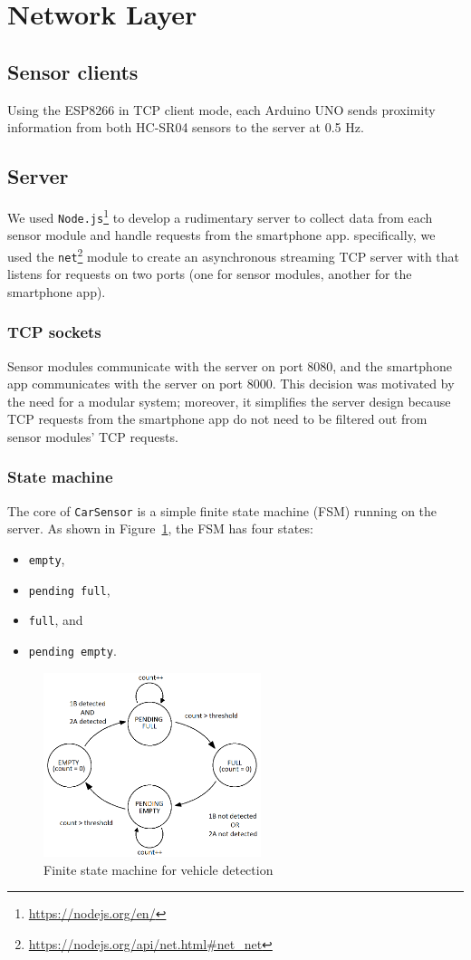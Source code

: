 \documentclass[conference]{IEEEtran}
\begin{document}
\section{Network Layer}
\subsection{Sensor clients}
Using the ESP8266 in TCP client mode, each Arduino UNO sends proximity information from both HC-SR04 sensors to the server at 0.5 Hz.
\subsection{Server}
We used \texttt{Node.js}\textsuperscript{\textregistered}\footnote{\url{https://nodejs.org/en/}} to develop a rudimentary server to collect data from each sensor module and handle requests from the smartphone app. specifically, we used the \texttt{net}\footnote{\url{https://nodejs.org/api/net.html#net_net}} module to create an asynchronous streaming TCP server with that listens for requests on two ports (one for sensor modules, another for the smartphone app).
\subsubsection{TCP sockets}
Sensor modules communicate with the server on port 8080, and the smartphone app communicates with the server on port 8000. This decision was motivated by the need for a modular system; moreover, it simplifies the server design because TCP requests from the smartphone app do not need to be filtered out from sensor modules' TCP requests.
\subsubsection{State machine}
The core of \texttt{CarSensor} is a simple finite state machine (FSM) running on the server. As shown in Figure~\ref{fig_fsm}, the FSM has four states:
\begin{itemize}
\item \texttt{empty},
\item \texttt{pending full},
\item \texttt{full}, and
\item \texttt{pending empty}.
\end{itemize}
\begin{figure}[h]
	\centering
	\includegraphics[width=2.5in]{FSM.png}
	\caption{Finite state machine for vehicle detection}
	\label{fig_fsm}
\end{figure}
\end{document}
